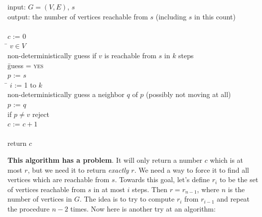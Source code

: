 \begin{program}
input: $G = (V,E)$, $s$ \\
output: the number of vertices reachable from $s$ (including $s$ in this count) \\
\\
$c$ := 0 \\
\FORALL \= $v \in V$ \DO \\
        \> non-deterministically guess if $v$ is reachable from $s$ in $k$ steps \\
        \> \IF \= guess = \textsc{yes} \THEN \\
        \>     \> $p$ := $s$ \\
        \>     \> \FOR \= $i$ := 1 to $k$ \DO \\
        \>     \>      \> non-deterministically guess a neighbor $q$ of $p$ (possibly not moving at all) \\
        \>     \>      \> $p$ := $q$ \\
        \>     \> if $p \ne v$ reject \\
        \>     \> $c$ := $c + 1$ \\
\\
return $c$
\end{program}

\textbf{This algorithm has a problem}.  It will only return a number
$c$ which is at most $r$, but we need it to return \emph{exactly} $r$.  We
need a way to force it to find all vertices which are reachable from
$s$.  Towards this goal, let's define $r_i$ to be the set of vertices reachable from $s$
in at most $i$ steps.  Then $r = r_{n-1}$, where $n$ is the number of
vertices in $G$.  The idea is to try to compute $r_i$ from $r_{i-1}$ and
repeat the procedure $n-2$ times. Now here is another try at an algorithm:

